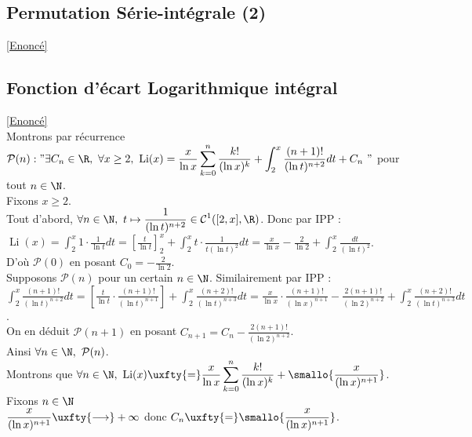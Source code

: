 \documentclass{book}
\begin{document}
	\subsection{Permutation Série-intégrale (2)}\label{sec:permutation-serie-integrale-2}
	\textcolor{blue}{\hyperref[Permutation série-intégrale 2]{[Enoncé]}}\\
	\subsection{Fonction d'écart Logarithmique intégral }\label{sec:fonction-decart-logarithmique-integral-etoile2}
	\textcolor{blue}{\hyperref[logint]{[Enoncé]}}\\
	Montrons par récurrence $\mathcal P(n):"\exists C_n\in \R,\ \forall x\geq 2,\ \operatorname{Li}(x)=\displaystyle\frac{x}{\ln x}\sum\limits_{k=0}^n\frac{k!}{(\ln x)^k}+\int_2^x\frac{(n+1)!}{(\ln t)^{n+2}}dt+C_n\ "$ pour tout $n\in \N$.\\
	Fixons $x\geq 2$.\\
	Tout d'abord, $\forall n\in \N,\ t\mapsto \displaystyle\frac{1}{(\ln t)^{n+2}}\in \mathcal C^1([2,x],\R)$. Donc par IPP :\\
	$\operatorname{Li}(x)=\displaystyle\int_2^x1\cdot\frac{1}{\ln t}dt=\left[\frac{t}{\ln t}\right]_2^x+\int_2^xt\cdot\frac{1}{t(\ln t)^2}dt=\frac{x}{\ln x}-\frac{2}{\ln 2}+\int_2^x\frac{dt}{(\ln t)^2}$.\\
	D'où $\mathcal P(0)$ en posant $C_0=\displaystyle-\frac{2}{\ln 2}$.\\
	Supposons $\mathcal P(n)$ pour un certain $n\in \N$. Similairement par IPP :\\
	$\displaystyle\int_2^x\frac{(n+1)!}{(\ln t)^{n+2}}dt=\left[\frac{t}{\ln t}\cdot\frac{(n+1)!}{(\ln t)^{n+1}}\right]+\int_2^x\frac{(n+2)!}{(\ln t)^{n+3}}dt=\frac{x}{\ln x}\cdot\frac{(n+1)!}{(\ln x)^{n+1}}-\frac{2(n+1)!}{(\ln 2)^{n+2}}+\int_2^x\frac{(n+2)!}{(\ln t)^{n+3}}dt$.\\
	On en déduit $\mathcal P(n+1)$ en posant $C_{n+1}=C_n-\displaystyle\frac{2(n+1)!}{(\ln 2)^{n+2}}$.\\
	Ainsi $\forall n\in \N,\ \mathcal P(n)$.\\
	Montrons que $\forall n\in \N,\ \operatorname{Li} (x)\uxfty{=}\displaystyle\frac{x}{\ln x}\sum\limits_{k=0}^n\frac{k!}{(\ln x)^k}+\smallo{\displaystyle\frac{x}{(\ln x)^{n+1}}}$. Fixons $n\in \N$\\
	$\displaystyle\frac{x}{(\ln x)^{n+1}}\uxfty{\longrightarrow}+\infty$ donc $C_n\uxfty{=}\smallo{\displaystyle\frac{x}{(\ln x)^{n+1}}}$.\\
\end{document}
